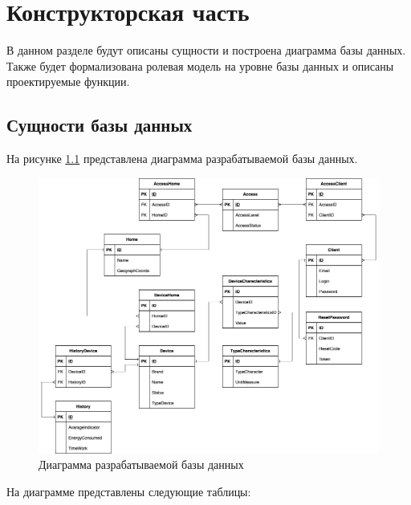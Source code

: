 \chapter{Конструкторская часть}

В данном разделе будут описаны сущности и построена диаграмма базы данных. 
Также будет формализована ролевая модель на уровне базы данных и описаны проектируемые функции.

\section{Сущности базы данных}

На рисунке \ref{img:newDB} представлена диаграмма разрабатываемой базы данных.

\begin{figure}[h]
    \includegraphics[width=0.9\linewidth]{img/newDB.png}
    \caption{\label{img:newDB} Диаграмма разрабатываемой базы данных}
\end{figure}
\noindent
\clearpage

На диаграмме представлены следующие таблицы:

